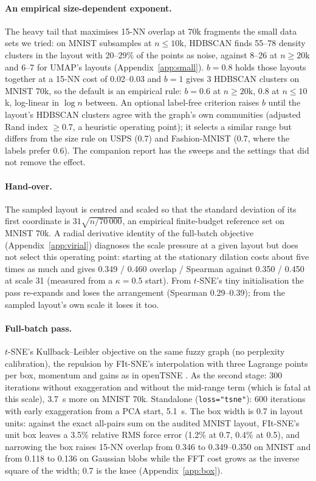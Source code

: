 \documentclass[10pt,twocolumn]{article}
\newcommand{\knn}{15-NN}
\begin{document}
\paragraph{An empirical size-dependent exponent.} The heavy tail that maximises \knn{} overlap at 70k
fragments the small data sets we tried: on MNIST subsamples at $n \le 10$k, HDBSCAN \citep{campello2013hdbscan,
mcinnes2017hdbscan} finds 55--78 density clusters in the layout with 20--29\% of the points as noise, against
8--26 at $n \ge 20$k and 6--7 for UMAP's layouts (Appendix~\ref{app:small}). $b = 0.8$ holds those layouts
together at a \knn{} cost of 0.02--0.03 and $b = 1$ gives 3 HDBSCAN clusters on MNIST 70k, so the default is an
empirical rule: $b = 0.6$ at $n \ge 20$k, $0.8$ at $n \le 10$k, log-linear in $\log n$ between. An optional
label-free criterion raises $b$ until the layout's HDBSCAN clusters agree with the graph's own communities
(adjusted Rand index $\ge 0.7$, a heuristic operating point); it selects a similar range but differs from the
size rule on USPS (0.7) and Fashion-MNIST (0.7, where the labels prefer 0.6). The companion report has the
sweeps and the settings that did not remove the effect.

\paragraph{Hand-over.} The sampled layout is centred and scaled so that the standard deviation of its first
coordinate is $31 \sqrt{n / 70\,000}$, an empirical finite-budget reference set on MNIST 70k. A radial derivative
identity of the full-batch objective (Appendix~\ref{app:virial}) diagnoses the scale pressure at a given layout
but does not select this operating point: starting at the stationary dilation costs about five times as much and
gives 0.349 / 0.460 overlap / Spearman against 0.350 / 0.450 at scale 31 (measured from a $\kappa = 0.5$ start). From $t$-SNE's tiny initialisation the pass re-expands and loses the
arrangement (Spearman 0.29--0.39); from the sampled layout's own scale it loses it too.

\paragraph{Full-batch pass.} $t$-SNE's Kullback--Leibler objective \citep{vandermaaten2008tsne} on the same fuzzy
graph (no perplexity calibration), the repulsion by FIt-SNE's interpolation \citep{linderman2019fitsne} with three
Lagrange points per box, momentum and gains as in openTSNE \citep{policar2019opentsne}. As the second stage: 300
iterations without exaggeration and without the mid-range term (which is fatal at this scale), 3.7~s more on MNIST 70k. Standalone (\texttt{loss="tsne"}): 600 iterations with early exaggeration from a PCA start, 5.1~s.
The box width is 0.7 in layout units: against the exact all-pairs sum on the audited MNIST layout, FIt-SNE's unit
box leaves a 3.5\% relative RMS force error (1.2\% at 0.7, 0.4\% at 0.5), and narrowing the box raises \knn{} overlap
from 0.346 to 0.349--0.350 on MNIST and from 0.118 to 0.136 on Gaussian blobs while the FFT cost grows as the
inverse square of the width; 0.7 is the knee (Appendix~\ref{app:box}).
\end{document}
